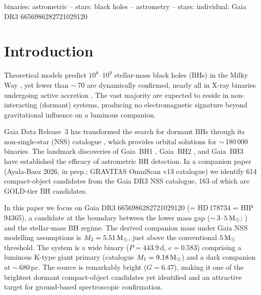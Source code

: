 \documentclass[usenatbib,fleqn]{mnras}
\newcommand{\Msun}{{\rm M}_\odot}
\begin{document}
\begin{keywords}
binaries: astrometric -- stars: black holes -- astrometry --
stars: individual: Gaia DR3 6656986282721029120
\end{keywords}

\section{Introduction}
\label{sec:intro}

Theoretical models predict $10^8$--$10^9$ stellar-mass black holes
(BHs) in the Milky Way \citep{AgolKamionkowski2002, Shapiro1983},
yet fewer than $\sim$\,70 are dynamically confirmed, nearly all in
X-ray binaries undergoing active accretion
\citep{RemillardMcClintock2006}.  The vast majority are expected to
reside in non-interacting (dormant) systems, producing no
electromagnetic signature beyond gravitational influence on a
luminous companion.

Gaia Data Release~3 \citep[DR3;][]{GaiaCollaboration2023} has
transformed the search for dormant BHs through its non-single-star
(NSS) catalogue \citep{GaiaNSS2023}, which provides orbital
solutions for $\sim$\,180\,000 binaries.  The landmark discoveries
of Gaia~BH1
\citep[$M_2 \approx 9.6\,\Msun$;][]{ElBadry2023a}, Gaia~BH2
\citep[$M_2 \approx 8.9\,\Msun$;][]{ElBadry2023b}, and Gaia~BH3
\citep[$M_2 \approx 33\,\Msun$;][]{GaiaBH3_2024} have established
the efficacy of astrometric BH detection.  In a companion paper
(Ayala-Baez 2026, in prep.; GRAVITAS OmniScan v13 catalogue) we
identify 614 compact-object candidates from the Gaia DR3 NSS
catalogue, 163 of which are GOLD-tier BH candidates.

In this paper we focus on Gaia DR3 6656986282721029120
(= HD\,178734 = HIP\,94365), a candidate
at the boundary between the lower mass gap
($\sim$\,$3$--$5\,\Msun$; \citealt{Bailyn1998, Ozel2010,
Farr2011}) and the stellar-mass BH regime.  The derived companion
mass under Gaia NSS modelling assumptions is $M_2 = 5.51\,\Msun$,
just above the conventional $5\,\Msun$ threshold.  The system is a
wide binary ($P = 443.9$\,d, $e = 0.583$) comprising a luminous
K-type giant primary (catalogue $M_1 = 9.18\,\Msun$) and a dark
companion at $\sim$\,$680$\,pc.  The source is remarkably bright
($G = 6.47$), making it one of the brightest dormant compact-object
candidates yet identified and an attractive target for ground-based
spectroscopic confirmation.
\end{document}
